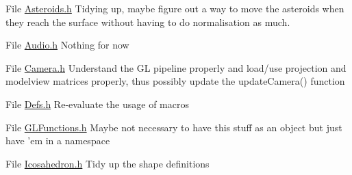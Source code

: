 \label{todo__todo000001}
\hypertarget{todo__todo000001}{}
 
\begin{DoxyDescription}
\item[File \hyperlink{Asteroids_8h}{Asteroids.h} ]Tidying up, maybe figure out a way to move the asteroids when they reach the surface without having to do normalisation as much. 
\end{DoxyDescription}

\label{todo__todo000002}
\hypertarget{todo__todo000002}{}
 
\begin{DoxyDescription}
\item[File \hyperlink{Audio_8h}{Audio.h} ]Nothing for now 
\end{DoxyDescription}

\label{todo__todo000003}
\hypertarget{todo__todo000003}{}
 
\begin{DoxyDescription}
\item[File \hyperlink{Camera_8h}{Camera.h} ]Understand the GL pipeline properly and load/use projection and modelview matrices properly, thus possibly update the updateCamera() function 
\end{DoxyDescription}

\label{todo__todo000004}
\hypertarget{todo__todo000004}{}
 
\begin{DoxyDescription}
\item[File \hyperlink{Defs_8h}{Defs.h} ]Re-\/evaluate the usage of macros 
\end{DoxyDescription}

\label{todo__todo000007}
\hypertarget{todo__todo000007}{}
 
\begin{DoxyDescription}
\item[File \hyperlink{GLFunctions_8h}{GLFunctions.h} ]Maybe not necessary to have this stuff as an object but just have 'em in a namespace 
\end{DoxyDescription}

\label{todo__todo000005}
\hypertarget{todo__todo000005}{}
 
\begin{DoxyDescription}
\item[File \hyperlink{Icosahedron_8h}{Icosahedron.h} ]Tidy up the shape definitions 
\end{DoxyDescription}

\label{todo__todo000006}
\hypertarget{todo__todo000006}{}
 
